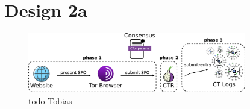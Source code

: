 \section{Design 2a} \label{sec:design-log}
\begin{figure}
    \centering
    \includegraphics[width=0.85\textwidth]{img/design-log}
    \caption{todo Tobias}
    \label{fig:design-log}
\end{figure}
